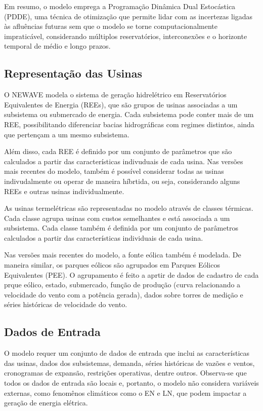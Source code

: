 Em resumo, o modelo emprega a Programação Dinâmica Dual Estocástica (PDDE), uma técnica de otimização que permite lidar 
com as incertezas ligadas às afluências futuras sem que o modelo se torne computacionalmente impraticável, considerando 
múltiplos reservatórios, interconexões e o horizonte temporal de médio e longo prazos.

\subsection{Representação das Usinas}
O NEWAVE modela o sistema de geração hidrelétrico em Reservatórios Equivalentes de Energia (REEs), que são grupos de
usinas associadas a um subsistema ou submercado de energia. Cada subsistema pode conter mais de um REE, possibilitando
diferenciar bacias hidrográficas com regimes distintos, ainda que pertençam a um mesmo subsistema. 

Além disso, cada REE é definido por um conjunto de parâmetros que são calculados a partir das características indivuduais 
de cada usina. Nas versões mais recentes do modelo, também é possível considerar todas as usinas indivudalmente ou operar
de maneira híbrtida, ou seja, considerando alguns REEs e outras usinas individualmente.

As usinas termelétricas são representadas no modelo através de classes térmicas. Cada classe agrupa usinas com custos 
semelhantes e está associada a um subsistema. Cada classe também é definida por um conjunto de parâmetros calculados
a partir das características individuais de cada usina.

Nas versões mais recentes do modelo, a fonte eólica também é modelada. De maneira similar, os parques eólicos são agrupados
em Parques Eólicos Equivalentes (PEE). O agrupamento é feito a aprtir de dados de cadastro de cada prque eólico, estado,
submercado, função de produção (curva relacionando a velocidade do vento com a potência gerada), dados sobre torres de
medição e séries históricas de velocidade do vento.

\subsection{Dados de Entrada}
O modelo requer um conjunto de dados de entrada que inclui as características das usinas, dados dos subsistemas, demanda,
séries históricas de vazões e ventos, cronogramas de expansão, restrições operativas, dentre outros. Observa-se
que todos os dados de entrada são locais e, portanto, o modelo não considera variáveis externas, como fenomênos climáticos
como o EN e LN, que podem impactar a geração de energia elétrica. 

